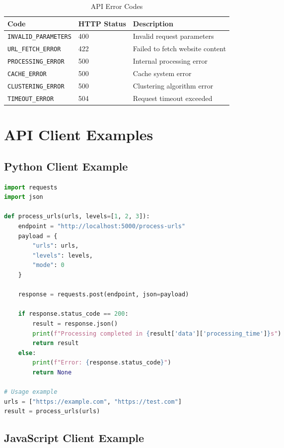 \begin{table}[h]
\centering
\caption{API Error Codes}
\begin{tabular}{|l|l|l|}
\hline
\textbf{Code} & \textbf{HTTP Status} & \textbf{Description} \\
\hline
\texttt{INVALID\_PARAMETERS} & 400 & Invalid request parameters \\
\texttt{URL\_FETCH\_ERROR} & 422 & Failed to fetch website content \\
\texttt{PROCESSING\_ERROR} & 500 & Internal processing error \\
\texttt{CACHE\_ERROR} & 500 & Cache system error \\
\texttt{CLUSTERING\_ERROR} & 500 & Clustering algorithm error \\
\texttt{TIMEOUT\_ERROR} & 504 & Request timeout exceeded \\
\hline
\end{tabular}
\end{table}

\section{API Client Examples}
\label{app:client_examples}

\subsection{Python Client Example}

\begin{lstlisting}[language=Python]
import requests
import json

def process_urls(urls, levels=[1, 2, 3]):
    endpoint = "http://localhost:5000/process-urls"
    payload = {
        "urls": urls,
        "levels": levels,
        "mode": 0
    }
    
    response = requests.post(endpoint, json=payload)
    
    if response.status_code == 200:
        result = response.json()
        print(f"Processing completed in {result['data']['processing_time']}s")
        return result
    else:
        print(f"Error: {response.status_code}")
        return None

# Usage example
urls = ["https://example.com", "https://test.com"]
result = process_urls(urls)
\end{lstlisting}

\subsection{JavaScript Client Example}

